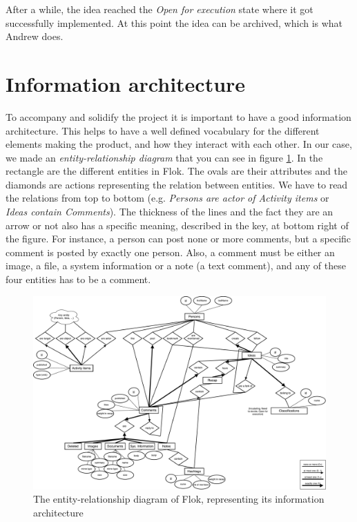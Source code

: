 \documentclass[a4paper,12pt,twoside]{article}
\begin{document}
After a while, the idea reached the \emph{Open for execution} state where it got successfully implemented.
At this point the idea can be archived, which is what Andrew does.


\section{Information architecture}
To accompany and solidify the project it is important to have a good information architecture.
This helps to have a well defined vocabulary for the different elements making the product, and how they interact with each other.
In our case, we made an \emph{entity-relationship diagram} that you can see in figure \ref{fig.erDiagram}.
In the rectangle are the different entities in Flok.
The ovals are their attributes and the diamonds are actions representing the relation between entities.
We have to read the relations from top to bottom (e.g. \emph{Persons are actor of Activity items} or \emph{Ideas contain Comments}).
The thickness of the lines and the fact they are an arrow or not also has a specific meaning, described in the key, at bottom right of the figure.
For instance, a person can post none or more comments, but a specific comment is posted by exactly one person.
Also, a comment must be either an image, a file, a system information or a note (a text comment), and any of these four entities has to be a comment.

\begin{figure}
    \centering
    \includegraphics[width=\textwidth]{images/erDiagram.pdf}
    \caption{The entity-relationship diagram of Flok, representing its information architecture}
    \label{fig.erDiagram}
\end{figure}
\end{document}
